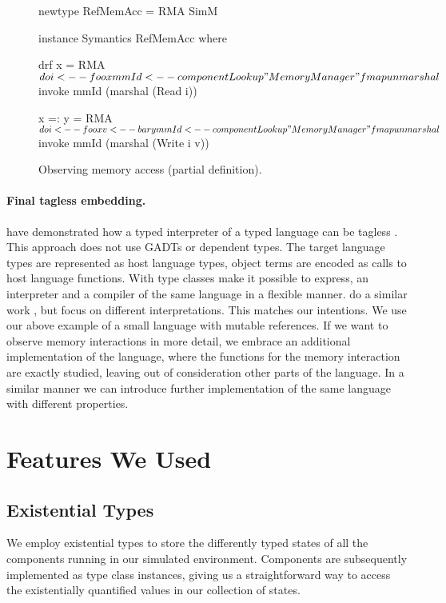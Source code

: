 \begin{figure}
\begin{code}
newtype RefMemAcc =  RMA SimM

instance Symantics RefMemAcc where

  drf x = RMA $ do
    i     <-- foo x
    mmId  <-- componentLookup "MemoryManager"
    fmap unmarshal $ invoke mmId (marshal (Read i))

  x =: y = RMA $ do
    i     <-- foo x
    v     <-- bar y
    mmId  <-- componentLookup "MemoryManager"
    fmap unmarshal $ invoke mmId (marshal (Write i v))
\end{code}
\vspace{-0.5em}
\caption{Observing memory access (partial definition).}
\vspace{-1em}
\label{lst_observing_memory_access}
\end{figure}


\paragraph{Final tagless embedding.}
\citeauthor{final_tagless_embedding} have demonstrated how a typed interpreter of a typed language can be tagless \cite{final_tagless_embedding}.
This approach does not use GADTs or dependent types.
The target language types are represented as host language types, object terms are encoded as calls to host language functions. With type classes \citeauthor{final_tagless_embedding} make it possible to express, \eg an interpreter and a compiler of the same language in a flexible manner.
\citeauthor{Hofer:2008:PED:1449913.1449935} do a similar work \cite{Hofer:2008:PED:1449913.1449935}, but focus on different interpretations.
This matches our intentions.
We use our above example of a small language with mutable references.
If we want to observe memory interactions in more detail, we embrace
an additional implementation of the language, where the functions for
the memory interaction are exactly studied, leaving out of consideration other parts of the language.
In a similar manner we can introduce further implementation of the same language with different properties.

\section{Features We Used}
\label{sec:impl-detail}

\subsection{Existential Types}
We employ existential types to store the differently typed states of all the components running in our simulated environment.
Components are subsequently implemented as type class instances, giving us a straightforward way to access the existentially quantified values in our collection of states.


